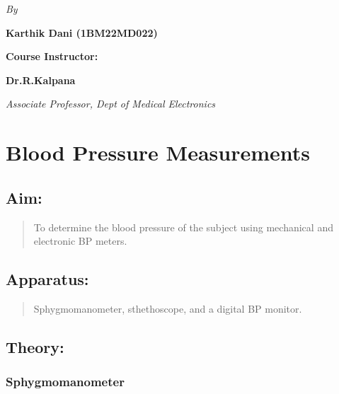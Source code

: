 \documentclass[
  11pt,
  letterpaper,
  DIV=11,
  numbers=noendperiod]{scrreprt}
\begin{document}
\begin{center}
    \textit{By}
\end{center}

\begin{center}
    \textbf{Karthik Dani (1BM22MD022)}
\end{center}

\begin{center}
    \large \textbf{Course Instructor:}
\end{center}

\begin{center}
    \textbf{Dr.R.Kalpana}
\end{center}

\begin{center} 
  \textit{Associate Professor, Dept of Medical Electronics}
\end{center}


\chapter{Blood Pressure Measurements}\label{blood-pressure-measurements}

\section{Aim:}\label{aim}

\begin{quote}
To determine the blood pressure of the subject using mechanical and
electronic BP meters.
\end{quote}

\section{Apparatus:}\label{apparatus}

\begin{quote}
Sphygmomanometer, sthethoscope, and a digital BP monitor.
\end{quote}

\section{Theory:}\label{theory}

\subsection{Sphygmomanometer}\label{sphygmomanometer}
\end{document}

